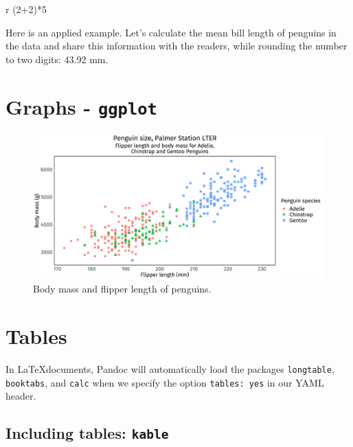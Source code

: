 \documentclass[
  11pt,
]{scrartcl}
\newenvironment{Shaded}{\begin{snugshade}}{\end{snugshade}}
\newcommand{\AttributeTok}[1]{\textcolor[rgb]{0.77,0.63,0.00}{#1}}
\newcommand{\StringTok}[1]{\textcolor[rgb]{0.31,0.60,0.02}{#1}}
\begin{document}
\begin{Shaded}
\begin{Highlighting}[]
\StringTok{\textasciigrave{}}\AttributeTok{r (2+2)*5}\StringTok{\textasciigrave{}}
\end{Highlighting}
\end{Shaded}

Here is an applied example. Let's calculate the mean bill length of penguins in the data and share this information with the readers, while rounding the number to two digits: 43.92 mm.

\newpage

\hypertarget{graphs---ggplot}{%
\section{\texorpdfstring{Graphs - \texttt{ggplot}}{Graphs - ggplot}}\label{graphs---ggplot}}

\begin{figure}

{\centering \includegraphics[width=0.9\linewidth]{figs/figggplot-1} 

}

\caption{Body mass and flipper length of penguins.}\label{fig:ggplot}
\end{figure}

\hypertarget{tables}{%
\section{Tables}\label{tables}}

In \LaTeX documents, Pandoc will automatically load the packages \texttt{longtable}, \texttt{booktabs}, and \texttt{calc} when we specify the option \texttt{tables:\ yes} in our YAML header.

\hypertarget{including-tables-kable}{%
\subsection{\texorpdfstring{Including tables: \texttt{kable}}{Including tables: kable}}\label{including-tables-kable}}
\end{document}
